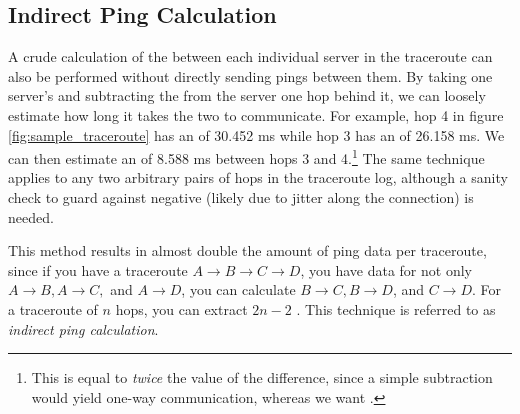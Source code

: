 \subsection{Indirect Ping Calculation}

A crude calculation of the \rtt between each individual server in the traceroute can also be performed without directly sending pings between them. By taking one server's \rtt and subtracting the \rtt from the server one hop behind it, we can loosely estimate how long it takes the two to communicate. For example, hop 4 in figure \ref{fig:sample_traceroute} has an \rtt of 30.452 ms while hop 3 has an \rtt of 26.158 ms. We can then estimate an \rtt of 8.588 ms between hops 3 and 4.\footnote{This is equal to \textit{twice} the value of the difference, since a simple subtraction would yield one-way communication, whereas we want \rtts.} The same technique applies to any two arbitrary pairs of hops in the traceroute log, although a sanity check to guard against negative \rtts (likely due to jitter along the connection) is needed.

This method results in almost double the amount of ping data per traceroute, since if you have a traceroute $A\rightarrow B\rightarrow C\rightarrow D$, you have data for not only $A\rightarrow B, A\rightarrow C,$ and $A\rightarrow D$, you can calculate $B\rightarrow C, B\rightarrow D$, and $C\rightarrow D$. For a traceroute of $n$ hops, you can extract $2n-2$ \rtts. This technique is referred to as \textit{indirect ping calculation}.
